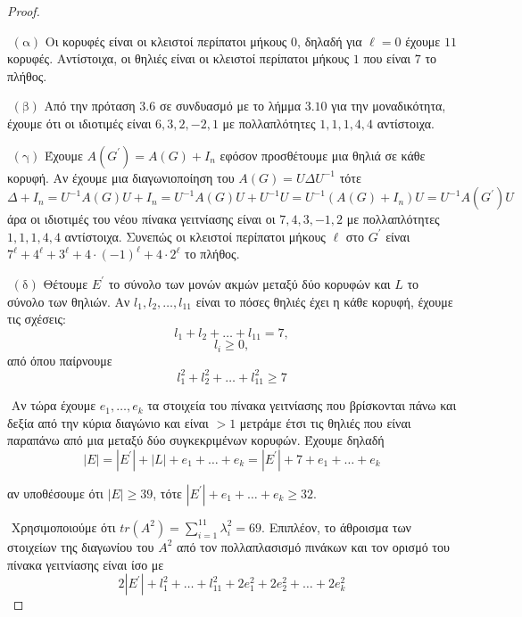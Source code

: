 \documentclass[oneside,a4paper]{article}
\begin{document}
\begin{proof} $ $

	$ $\newline
	$(\text{α})$ Οι κορυφές είναι οι κλειστοί περίπατοι μήκους $0$, δηλαδή για $\ell = 0$ έχουμε $11$ κορυφές. Αντίστοιχα, οι θηλιές είναι οι κλειστοί περίπατοι μήκους $1$ που είναι $7$ το πλήθος.

	$ $\newline
	$(\text{β})$ Από την πρόταση $3.6$ σε συνδυασμό με το λήμμα $3.10$ για την μοναδικότητα, έχουμε ότι οι ιδιοτιμές είναι $6,3,2,-2,1$ με πολλαπλότητες $1,1,1,4,4$ αντίστοιχα.

	$ $\newline
	$(\text{γ})$ Έχουμε $A(G^{\prime}) = A(G) + I_n$ εφόσον προσθέτουμε μια θηλιά σε κάθε κορυφή. Αν έχουμε μια διαγωνιοποίηση του $A(G) = U \Delta U^{-1}$ τότε
	$$\Delta + I_n = U^{-1} A(G) U + I_n = U^{-1} A(G) U + U^{-1}U = U^{-1}\left(A(G) + I_n \right)U = U^{-1} A(G^{\prime})U$$
	άρα οι ιδιοτιμές του νέου πίνακα γειτνίασης είναι οι $7,4,3,-1,2$ με πολλαπλότητες $1,1,1,4,4$ αντίστοιχα. Συνεπώς οι κλειστοί περίπατοι μήκους $\ell$ στο $G^{\prime}$ είναι $7^{\ell} +4^{\ell} + 3^{\ell} + 4\cdot (-1)^{\ell} + 4\cdot 2^{\ell}$ το πλήθος.

	$ $\newline
	$(\text{δ})$ Θέτουμε $E^{\prime}$ το σύνολο των μονών ακμών μεταξύ δύο κορυφών και $L$ το σύνολο των θηλιών. Αν $l_1, l_2 ,\ldots, l_{11}$ είναι το πόσες θηλιές έχει η κάθε κορυφή, έχουμε τις σχέσεις:
	$$l_1 + l_2 + \ldots + l_{11} = 7,$$
	$$l_i \geq 0,$$
	από όπου παίρνουμε
	$$l^2_1 + l^2_2 + \ldots +l^2_{11} \geq 7$$

	$ $\newline
	Αν τώρα έχουμε $e_1 ,\ldots, e_k$ τα στοιχεία του πίνακα γειτνίασης που βρίσκονται πάνω και δεξία από την κύρια διαγώνιο και είναι $>1$ μετράμε έτσι τις θηλιές που είναι παραπάνω από μια μεταξύ δύο συγκεκριμένων κορυφών. Έχουμε δηλαδή
	$$|E| = |E^{\prime}| + |L| + e_1 + \ldots + e_k = |E^{\prime}| + 7 + e_1 + \ldots +  e_k $$

	αν υποθέσουμε ότι $|E|\geq 39$, τότε $|E^{\prime}| + e_1 + \ldots + e_k \geq 32$.

	$ $\newline
	Χρησιμοποιούμε ότι $tr(A^2) = \sum\limits_{i=1}^{11} \lambda^2_i = 69$. Επιπλέον, το άθροισμα των στοιχείων της διαγωνίου του $A^2$ από τον πολλαπλασισμό πινάκων και τον ορισμό του πίνακα γειτνίασης είναι ίσο με 
	$$2|E^{\prime}| + l^2_1 + \ldots + l^2_{11} + 2e^2_1 + 2e^2_2 + \ldots + 2e^2_k$$


\end{proof}
\end{document}
